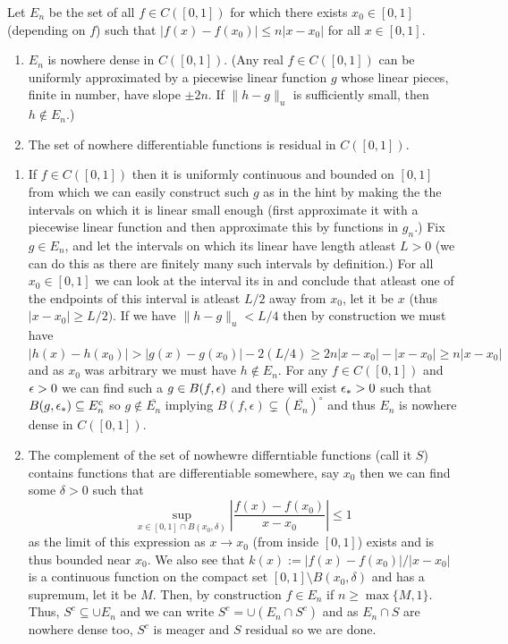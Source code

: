 \documentclass[12pt,a4paper]{article}
\begin{document}
\begin{problem}\label{prob:5-42}
Let $E_n$ be the set of all $f \in C([0,1])$ for which there exists $x_0 \in [0,1]$ (depending on $f$) such that $|f(x)-f(x_0)| \le n|x-x_0|$ for all $x \in [0,1]$.
\begin{enumerate}[label=\alph*.]
\item $E_n$ is nowhere dense in $C([0,1])$. (Any real $f \in C([0,1])$ can be uniformly approximated by a piecewise linear function $g$ whose linear pieces, finite in number, have slope $\pm 2n$. If $\|h-g\|_u$ is sufficiently small, then $h \notin E_n$.)
\item The set of nowhere differentiable functions is residual in $C([0,1])$.
\end{enumerate}
\end{problem}
\begin{solution}
    \begin{enumerate}[label=\alph*.]
        \item If $f\in C([0,1])$ then it is uniformly continuous and bounded on $[0,1]$ from which we can easily construct such $g$ as in the hint by making the the intervals on which it is linear small enough (first approximate it with a piecewise linear function and then approximate this by functions in $g_n$.)  
            Fix $g\in E_n$, and let the intervals on which its linear have length atleast $L>0$ (we can do this as there are finitely many such intervals by definition.) 
            For all $x_0\in[0,1]$ we can look at the interval its in and conclude that atleast one of the endpoints of this interval is atleast $L/2$ away from $x_0$, let it be $x$ (thus $|x-x_0|\geq L/2)$. 
            If we have $\|h-g\|_u<L/4$ then by construction we must have $|h(x)-h(x_0)|>|g(x)-g(x_0)|-2(L/4)\geq 2n|x-x_0|-|x-x_0|\geq n|x-x_0|$ and as $x_0$ was arbitrary we must have $h\notin E_n.$ 
            For any $f\in C([0,1])$ and $\epsilon>0$ we can find such a $g\in B(f,\epsilon)$ and there will exist $\epsilon_*>0$ such that $B(g,\epsilon_*) \subseteq E_n^c$ so $g\notin\overline{E_n}$ implying $B(f,\epsilon) \subsetneq( \overline{E_n})^\circ$ and thus $E_n$ is nowhere dense in $C([0,1]).$ 
        \item The complement of the set of nowhewre differntiable functions (call it $S$) contains functions that are differentiable somewhere, say $x_0$ then we can find some $\delta>0$ such that 
            \[
                \sup_{x\in[0,1]\cap B(x_0,\delta)}\left| \frac{f(x)-f(x_0)}{x-x_0}\right|\leq 1
            \]
            as the limit of this expression as $x\to x_0$ (from inside $[0,1]$) exists and is thus bounded near $x_0.$ 
            We also see that $k(x):=|f(x)-f(x_0)|/|x-x_0|$ is a continuous function on the compact set $[0,1]\setminus B(x_0,\delta)$ and has a supremum, let it be $M.$ 
            Then, by construction $f\in E_n$ if $n\geq\max\{M,1\}.$ 
            Thus, $S^c\subseteq \cup E_n$ and we can write $S^c=\cup(E_n\cap S^c)$ and as $E_n\cap S$ are nowhere dense too, $S^c$ is meager and $S$ residual so we are done. 
            
    \end{enumerate}
\end{solution}
\end{document}
